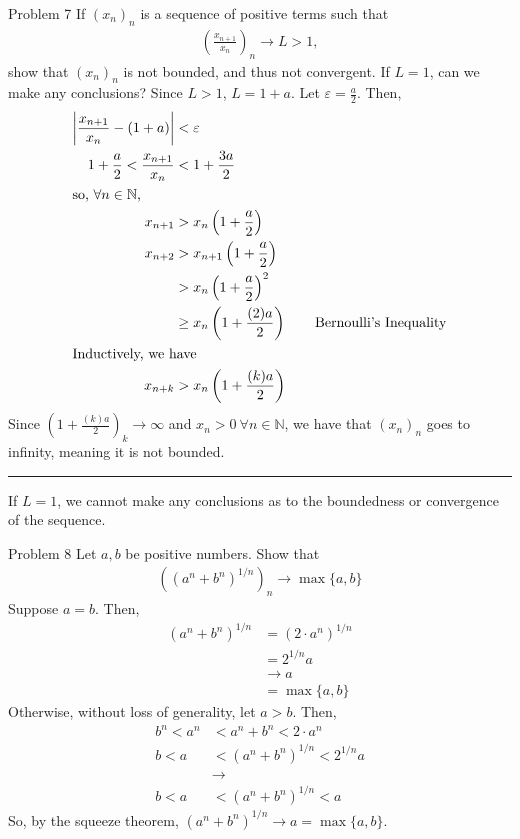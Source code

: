 \documentclass[10pt]{extarticle}
\newcommand{\N}{\mathbb{N}}
\begin{document}
  \begin{problem}{Problem 7}
    If $(x_n)_n$ is a sequence of positive terms such that
    \begin{align*}
      \left(\frac{x_{n+1}}{x_n}\right)_n \xrightarrow{} L > 1,
    \end{align*}
    show that $(x_n)_n$ is not bounded, and thus not convergent. If $L = 1$, can we make any conclusions?
    \tcblower
    Since $L > 1$, $L = 1 + a$. Let $\varepsilon = \frac{a}{2}$. Then,
    \begin{align*}
      \left|\frac{x_{n+1}}{x_n} - (1+a)\right| &< \varepsilon\\
      1 + \frac{a}{2} < \frac{x_{n+1}}{x_n} &< 1 + \frac{3a}{2}\\
      \shortintertext{so, $\forall n\in\N$,}
      x_{n+1} &> x_n \left(1 + \frac{a}{2}\right)\\
      x_{n+2} &> x_{n+1}\left(1 + \frac{a}{2}\right)\\
              &> x_n \left(1 + \frac{a}{2}\right)^2\\
              &\geq x_n \left(1 + \frac{(2)a}{2}\right) \tag*{Bernoulli's Inequality}\\
              \shortintertext{Inductively, we have}
      x_{n+k} &> x_n \left(1 + \frac{(k)a}{2}\right)
    \end{align*}
    Since $\left(1 + \frac{(k)a}{2}\right)_k \rightarrow \infty$ and $x_n > 0~\forall n\in\N$, we have that $\left(x_{n}\right)_n$ goes to infinity, meaning it is not bounded.\\
    \vspace{4pt}
    \rule{\textwidth}{0.4pt}
    \vspace{4pt}
    If $L = 1$, we cannot make any conclusions as to the boundedness or convergence of the sequence.
  \end{problem}
  \begin{problem}{Problem 8}
    Let $a,b$ be positive numbers. Show that
    \begin{align*}
      \left((a^n + b^n)^{1/n}\right)_n \rightarrow \max\{a,b\}
    \end{align*}
    \tcblower
    Suppose $a = b$. Then,
    \begin{align*}
      \left(a^n + b^n\right)^{1/n} &= (2\cdot a^n)^{1/n}\\
                                   &= 2^{1/n}a\\
                                   &\rightarrow a \tag*{sequence of roots converges to $1$}\\
                                   &= \max\{a,b\}
    \end{align*}
    Otherwise, without loss of generality, let $a > b$. Then,
    \begin{align*}
      b^n < a^n &< a^n + b^n < 2\cdot a^n\\
      b < a &< \left(a^n + b^n\right)^{1/n} < 2^{1/n} a\\
            &\rightarrow\\
      b < a &< \left(a^n + b^n\right)^{1/n} < a \tag*{sequence of roots converges to $1$}
    \end{align*}
    So, by the squeeze theorem, $\left(a^n + b^n\right)^{1/n}\rightarrow a = \max\{a,b\}$.
  \end{problem}
\end{document}

